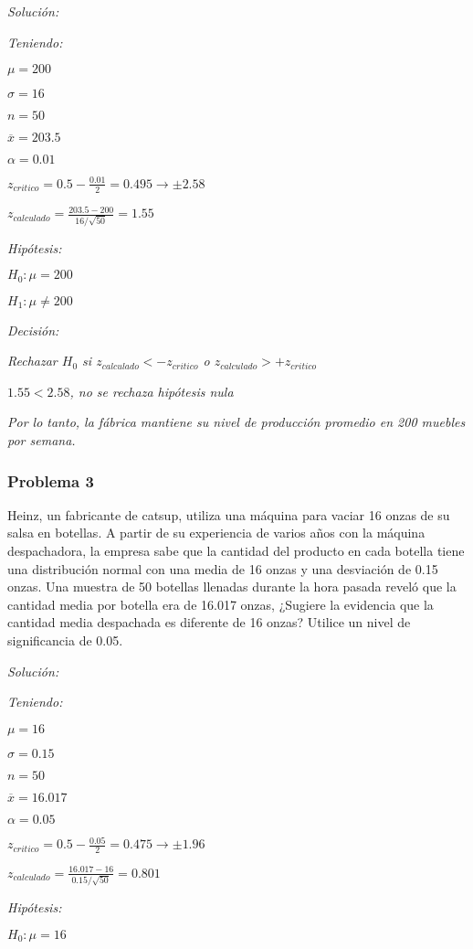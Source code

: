 \documentclass[a4paper, 12pt]{article}
\begin{document}
\emph{Solución:}

\emph{Teniendo:}

$\mu=200$

$\sigma=16$

$n=50$

$\overline{x}=203.5$

$\alpha=0.01$

$z_{critico}=0.5-\frac{0.01}{2}=0.495\to\pm 2.58$

$z_{calculado}=\frac{203.5-200}{16/\sqrt{50}}=1.55$

\emph{Hipótesis:}

$H_0:\mu=200$

$H_1:\mu\neq 200$

\emph{Decisión:}

\emph{Rechazar $H_0$ si $z_{calculado}<-z_{critico}$ o $z_{calculado}>+z_{critico}$}

$1.55<2.58$\emph{, no se rechaza hipótesis nula}

\emph{Por lo tanto, la fábrica mantiene su nivel de producción promedio en 200 muebles por semana.}

\subsubsection{Problema 3}
Heinz, un fabricante de catsup, utiliza una máquina para vaciar 16 onzas de su salsa en botellas. A partir de su experiencia de varios años con la máquina despachadora, la empresa sabe que la cantidad del producto en cada botella tiene una distribución normal con una media de 16 onzas y una desviación de 0.15 onzas. Una muestra de 50 botellas llenadas durante la hora pasada reveló que la cantidad media por botella era de 16.017 onzas, ¿Sugiere la evidencia que la cantidad media despachada es diferente de 16 onzas? Utilice un nivel de significancia de 0.05.

\emph{Solución:}

\emph{Teniendo:}

$\mu=16$

$\sigma=0.15$

$n=50$

$\overline{x}=16.017$

$\alpha=0.05$

$z_{critico}=0.5-\frac{0.05}{2}=0.475\to\pm 1.96$

$z_{calculado}=\frac{16.017-16}{0.15/\sqrt{50}}=0.801$

\emph{Hipótesis:}

$H_0:\mu=16$
\end{document}
